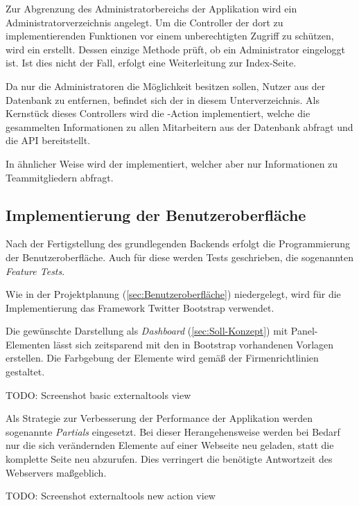 Zur Abgrenzung des Administratorbereichs der Applikation wird ein Administratorverzeichnis angelegt.
Um die Controller der dort zu implementierenden Funktionen vor einem unberechtigten Zugriff zu schützen, wird ein
 erstellt. Dessen einzige Methode prüft, ob ein Administrator eingeloggt ist.
Ist dies nicht der Fall, erfolgt eine Weiterleitung zur Index-Seite.

Da nur die Administratoren die Möglichkeit besitzen sollen, Nutzer aus der Datenbank zu entfernen,
befindet sich der  in diesem Unterverzeichnis. Als Kernstück dieses
Controllers wird die -Action implementiert, welche die gesammelten Informationen
zu allen Mitarbeitern aus der Datenbank abfragt und die API bereitstellt.
\newline
{}

In ähnlicher Weise wird der  implementiert, welcher aber nur
Informationen zu Teammitgliedern abfragt.

\subsection{Implementierung der Benutzeroberfläche}
\label{sec:Implementierung der Benutzeroberfläche}
Nach der Fertigstellung des grundlegenden Backends erfolgt die Programmierung der Benutzeroberfläche.
Auch für diese werden Tests geschrieben, die sogenannten \textit{Feature Tests}.
\newline
{}

Wie in der Projektplanung (\Vgl \ref{sec:Benutzeroberfläche}) niedergelegt, wird für die Implementierung
das Framework Twitter Bootstrap verwendet.

Die gewünschte Darstellung als \textit{Dashboard} (\Vgl \ref{sec:Soll-Konzept}) mit Panel-Elementen
lässt sich zeitsparend mit den in Bootstrap vorhandenen Vorlagen erstellen. Die Farbgebung der Elemente wird gemäß der
Firmenrichtlinien gestaltet.

TODO: Screenshot basic externaltools view

Als Strategie zur Verbesserung der Performance der Applikation werden sogenannte
\textit{Partials} eingesetzt. Bei dieser Herangehensweise werden bei Bedarf nur die sich
verändernden Elemente auf einer Webseite neu geladen, statt die komplette Seite neu abzurufen.
Dies verringert die benötigte Antwortzeit des Webservers maßgeblich.

TODO: Screenshot externaltools new action view

